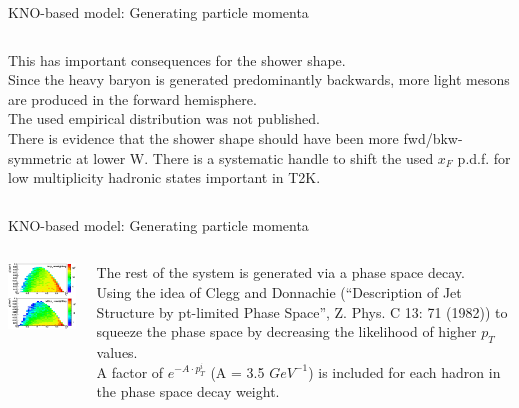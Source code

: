 \begin{frame}{KNO-based model: Generating particle momenta}
\begin{columns}[T]
\begin{column}{0.60\textwidth}
      This has important consequences for the shower shape.\\
      Since the heavy baryon is generated predominantly backwards, more light mesons
      are produced in the forward hemisphere.\\
      The used empirical distribution was not published.\\
      There is evidence that the shower shape should have been more fwd/bkw-symmetric at lower W.
      There is a systematic handle to shift the used $x_{F}$ p.d.f. for low multiplicity hadronic
      states important in T2K.
  \end{column}
\end{columns}
\end{frame}


\begin{frame}{KNO-based model: Generating particle momenta}

\begin{columns}[T]
  \begin{column}{0.60\textwidth}
    \includegraphics[width=200px]{./images/nuint/dis/pT2ReweightExample.eps}\\
  \end{column}
  \begin{column}{0.40\textwidth}
     The rest of the system is generated via a phase space decay.\\
     Using the idea of Clegg and Donnachie
     (“Description of Jet Structure by pt-limited Phase Space”, Z. Phys. C 13: 71 (1982))
     to squeeze the phase space by decreasing the likelihood of higher $p_{T}$ values.\\
     A factor of $e^{-A \cdot p^{i}_{T}}$ (A = 3.5 $GeV^{-1}$) 
     is included for each hadron in the phase space decay weight.
  \end{column}
\end{columns}
\end{frame}


